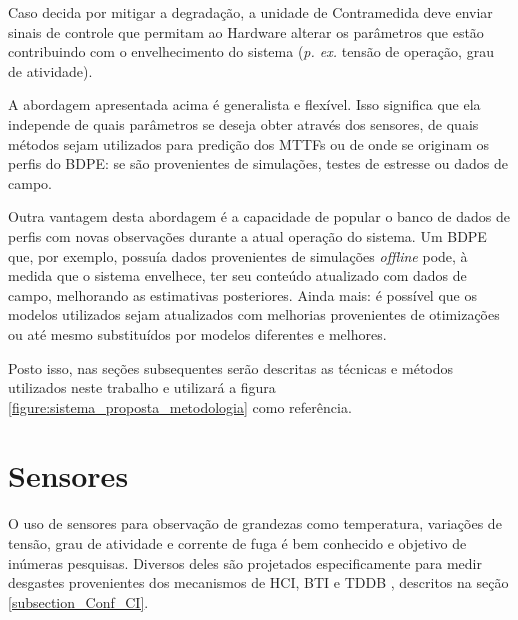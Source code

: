 Caso decida por mitigar a degradação, a unidade de Contramedida deve enviar sinais de controle que permitam ao Hardware alterar os parâmetros que estão contribuindo com o envelhecimento do sistema (\textit{p. ex.} tensão de operação, grau de atividade).

A abordagem apresentada acima é generalista e flexível. Isso significa que ela independe de quais parâmetros se deseja obter através dos sensores, de quais métodos sejam utilizados para predição dos MTTFs ou de onde se originam os perfis do BDPE: se são provenientes de simulações, testes de estresse ou dados de campo.

Outra vantagem desta abordagem é a capacidade de popular o banco de dados de perfis com novas observações durante a atual operação do sistema. Um BDPE que, por exemplo, possuía dados provenientes de simulações \textit{offline} pode, à medida que o sistema envelhece, ter seu conteúdo atualizado com dados de campo, melhorando as estimativas posteriores. Ainda mais: é possível que os modelos utilizados sejam atualizados com melhorias provenientes de otimizações ou até mesmo substituídos por modelos diferentes e melhores.

Posto isso, nas seções subsequentes serão descritas as técnicas e métodos utilizados neste trabalho e utilizará a figura \ref{figure:sistema_proposta_metodologia} como referência.

\section{Sensores}
O uso de sensores para observação de grandezas como temperatura, variações de tensão, grau de atividade e corrente de fuga é bem conhecido e objetivo de inúmeras pesquisas. Diversos deles são projetados especificamente para medir desgastes provenientes dos mecanismos de HCI, BTI e TDDB \cite{Kim2010}\cite{Keane2010}\cite{Kim2008}\cite{Karl2008}, descritos na seção \ref{subsection_Conf_CI}.

